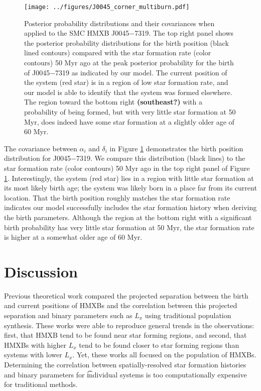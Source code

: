 \documentclass[12pt, preprint]{aastex}
\begin{document}
\begin{figure}[h!]
\begin{center}
\texttt{[image: ../figures/J0045\_corner\_multiburn.pdf]}
\caption{Posterior probability distributions and their covariances when applied to the SMC HMXB J0045$-$7319. The top right panel shows the posterior probability distributions for the birth position (black lined contours) compared with the star formation rate (color contours) 50 Myr ago at the peak posterior probability for the birth of J0045$-$7319 as indicated by our model. The current position of the system (red star) is in a region of low star formation rate, and our model is able to identify that the system was formed elsewhere. The region toward the bottom right {\bf (southeast?)} with a probability of being formed, but with very little star formation at 50 Myr, does indeed have some star formation at a slightly older age of 60 Myr.}
\label{fig:J0045_corner}
\end{center}
\end{figure}

The covariance between $\alpha_i$ and $\delta_i$ in Figure \ref{fig:J0045_corner} demonstrates the birth position distribution for J0045$-$7319. We compare this distribution (black lines) to the star formation rate (color contours) 50 Myr ago in the top right panel of Figure \ref{fig:J0045_corner}. Interestingly, the system (red star) lies in a region with little star formation at its most likely birth age; the system was likely born in a place far from its current location. That the birth position roughly matches the star formation rate indicates our model successfully includes the star formation history when deriving the birth parameters. Although the region at the bottom right with a significant birth probability has very little star formation at 50 Myr, the star formation rate is higher at a somewhat older age of 60 Myr.





\section{Discussion}

Previous theoretical work compared the projected separation between the birth and current positions of HMXBs \citet{sepinsky05} and the correlation between this projected separation and binary parameters such as $L_x$ \citet{zuo10,zuo15} using traditional population synthesis. These works were able to reproduce general trends in the observations: first, that HMXB tend to be found near star forming regions, and second, that HMXBs with higher $L_x$ tend to be found closer to star forming regions than systems with lower $L_x$. Yet, these works all focused on the population of HMXBs. Determining the correlation between spatially-resolved star formation histories and binary parameters for {\t individual} systems is too computationally expensive for traditional methods.
\end{document}
